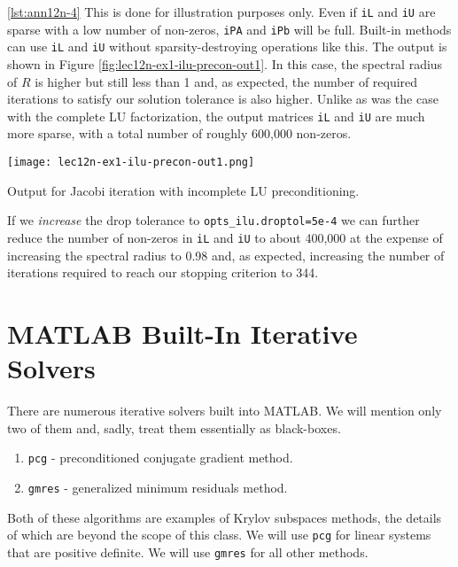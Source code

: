\noindent \ref{lst:ann12n-4} This is done for illustration purposes only.  Even if \lstinline[style=myMatlab]{iL} and \lstinline[style=myMatlab]{iU} are sparse with a low number of non-zeros, \lstinline[style=myMatlab]{iPA} and \lstinline[style=myMatlab]{iPb} will be full.  Built-in methods can use \lstinline[style=myMatlab]{iL} and \lstinline[style=myMatlab]{iU} without sparsity-destroying operations like this.
The output is shown in Figure \ref{fig:lec12n-ex1-ilu-precon-out1}.  In this case, the spectral radius of $R$ is higher but still less than 1 and, as expected, the number of required iterations to satisfy our solution tolerance is also higher.  Unlike as was the case with the complete LU factorization, the output matrices \lstinline[style=myMatlab]{iL} and \lstinline[style=myMatlab]{iU} are much more sparse, with a total number of roughly 600,000 non-zeros.  
\begin{marginfigure}
\texttt{[image: lec12n-ex1-ilu-precon-out1.png]}
\caption{Output for Jacobi iteration with incomplete LU preconditioning.}
\label{fig:lec12n-ex1-ilu-precon-out1}
\end{marginfigure}
If we \emph{increase} the drop tolerance to \lstinline[style=myMatlab]{opts_ilu.droptol=5e-4} we can further reduce the number of non-zeros in \lstinline[style=myMatlab]{iL} and \lstinline[style=myMatlab]{iU} to about 400,000 at the expense of increasing the spectral radius to 0.98 and, as expected, increasing the number of iterations required to reach our stopping criterion to 344.

\section{MATLAB Built-In Iterative Solvers}
There are numerous iterative solvers built into MATLAB.  We will mention only two of them and, sadly, treat them essentially as black-boxes.   
\begin{enumerate}
\item \lstinline[style=myMatlab]{pcg} - preconditioned conjugate gradient method.  
\item \lstinline[style=myMatlab]{gmres} - generalized minimum residuals method.
\end{enumerate}
Both of these algorithms are examples of Krylov subspaces methods, the details of which are beyond the scope of this class. We will use \lstinline[style=myMatlab]{pcg} for linear systems that are positive definite.  We will use \lstinline[style=myMatlab]{gmres} for all other methods.  

